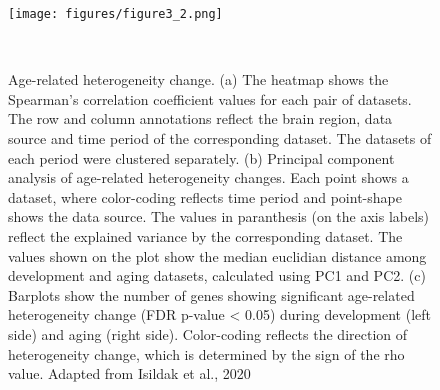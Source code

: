 \begin{figure}[h]
    \centering
    \texttt{[image: figures/figure3\_2.png]}
    \caption{Age-related heterogeneity change. 
    (a) The heatmap shows the Spearman's correlation coefficient values for each pair of datasets.
    The row and column annotations reflect the brain region, data source and time period of the corresponding dataset.
    The datasets of each period were clustered separately.
    (b) Principal component analysis of age-related heterogeneity changes. Each point shows a dataset, 
    where color-coding reflects time period and point-shape shows the data source. 
    The values in paranthesis (on the axis labels) reflect the explained variance by the corresponding dataset.
    The values shown on the plot show the median euclidian distance among development and aging datasets, 
    calculated using PC1 and PC2.
    (c) Barplots show the number of genes showing significant age-related heterogeneity change (FDR p-value < 0.05) during development (left side) and aging (right side).
    Color-coding reflects the direction of heterogeneity change, which is determined by the sign of the rho value.
    Adapted from Isildak et al., 2020
    }~\label{fig:fig3.2}
\end{figure}

